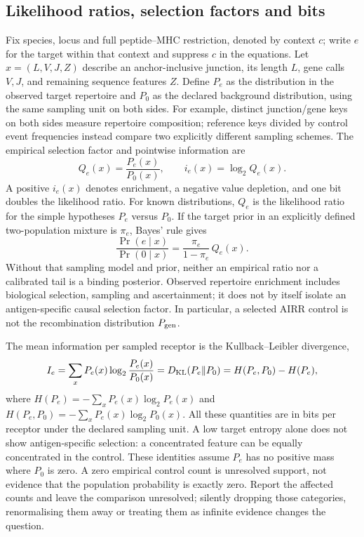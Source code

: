 \documentclass[10pt,a4paper]{article}
\theoremstyle{definition}
\begin{document}
\subsection{Likelihood ratios, selection factors and bits}
Fix species, locus and full peptide--MHC restriction, denoted by context $c$; write $e$ for the target within that context and suppress $c$ in the equations.
Let $x=(L,V,J,Z)$ describe an anchor-inclusive junction, its length $L$, gene calls $V,J$, and remaining sequence features $Z$.
Define $P_e$ as the distribution in the observed target repertoire and $P_0$ as the declared background distribution, using the same sampling unit on both sides.
For example, distinct junction/gene keys on both sides measure repertoire composition; reference keys divided by control event frequencies instead compare two explicitly different sampling schemes.
The empirical selection factor and pointwise information are
\begin{equation}
 Q_e(x)=\frac{P_e(x)}{P_0(x)},\qquad
 i_e(x)=\log_2 Q_e(x).
 \label{eq:selection-factor}
\end{equation}
A positive $i_e(x)$ denotes enrichment, a negative value depletion, and one bit doubles the likelihood ratio.
For known distributions, $Q_e$ is the likelihood ratio for the simple hypotheses $P_e$ versus $P_0$.
If the target prior in an explicitly defined two-population mixture is $\pi_e$, Bayes' rule gives
\[
 \frac{\Pr(e\mid x)}{\Pr(0\mid x)}
 =\frac{\pi_e}{1-\pi_e}\,Q_e(x).
\]
Without that sampling model and prior, neither an empirical ratio nor a calibrated tail is a binding posterior.
Observed repertoire enrichment includes biological selection, sampling and ascertainment; it does not by itself isolate an antigen-specific causal selection factor.
In particular, a selected AIRR control is not the recombination distribution $P_{\rm gen}$.

The mean information per sampled receptor is the Kullback--Leibler divergence,
\begin{equation}
 I_e=\sum_x P_e(x)\log_2\frac{P_e(x)}{P_0(x)}
 =D_{\rm KL}(P_e\Vert P_0)=H(P_e,P_0)-H(P_e),
 \label{eq:selection-kl}
\end{equation}
where $H(P_e)=-\sum_xP_e(x)\log_2P_e(x)$ and $H(P_e,P_0)=-\sum_xP_e(x)\log_2P_0(x)$.
All these quantities are in bits per receptor under the declared sampling unit.
A low target entropy alone does not show antigen-specific selection: a concentrated feature can be equally concentrated in the control.
These identities assume $P_e$ has no positive mass where $P_0$ is zero.
A zero empirical control count is unresolved support, not evidence that the population probability is exactly zero.
Report the affected counts and leave the comparison unresolved; silently dropping those categories, renormalising them away or treating them as infinite evidence changes the question.
\end{document}
